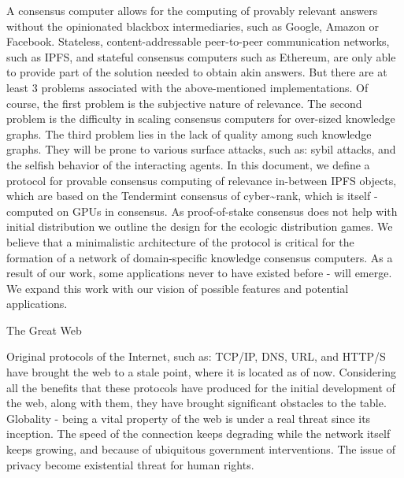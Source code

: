 \documentclass[8pt,oneside]{amsart}
\title{\fontsize{16}{17}\selectfont\textnormal{\MakeLowercase{\play{cyber: \uppercase{C}omputing the knowledge of the \uppercase{G}reat \uppercase{W}eb}}}}
\author{\fontsize{8}{9}\selectfont{
    \MakeLowercase{
    @xhipster \& @litvintech work in progress as of \today
    }
  }
}
\makeatletter
\renewcommand\subsection{\@startsection{subsection}
                                    {2}{\z@}
                                    {-3.25ex\@plus -1ex \@minus -.2ex}
                                    {0ex \@plus .2ex}
                                    {\play\Large}
                        }
\newcommand{\titleSection}[1]{\subsection{#1}}
\newenvironment{Figure}
  {\par\medskip\noindent\minipage{\linewidth}}
  {\endminipage\par\medskip}
\providecommand\abstractname{Abstract}
\renewenvironment{abstract}{%
  \centering\normalfont
  \list{}{\leftmargin2.1cm \rightmargin\leftmargin}
  {\par\noindent{\normalfont\abstractname.}}
  \item\relax
}{

  \endlist \par\bigskip
}
\makeatother
\begin{document}
\maketitle
\selectfont
\raggedbottom
\justifying

\vspace{-3em}{
\begin{Figure}
\medskip
\centering
\texttt{[image: graph.png]}
\medskip
\end{Figure}
}

\begin{abstract}
A consensus computer allows for the computing of provably relevant answers without the opinionated blackbox intermediaries, such as Google, Amazon or Facebook. Stateless, content-addressable peer-to-peer communication networks, such as IPFS, and stateful consensus computers such as Ethereum, are only able to provide part of the solution needed to obtain akin answers. But there are at least 3 problems associated with the above-mentioned implementations. Of course, the first problem is the subjective nature of relevance. The second problem is the difficulty in scaling consensus computers for over-sized knowledge graphs. The third problem lies in the lack of quality among such knowledge graphs. They will be prone to various surface attacks, such as: sybil attacks, and the selfish behavior of the interacting agents. In this document, we define a protocol for provable consensus computing of relevance in-between IPFS objects, which are based on the Tendermint consensus of cyber\~{}rank, which is itself - computed on GPUs in consensus. As proof-of-stake consensus does not help with initial distribution we outline the design for the ecologic distribution games. We believe that a minimalistic architecture of the protocol is critical for the formation of a network of domain-specific knowledge consensus computers. As a result of our work, some applications never to have existed before - will emerge. We expand this work with our vision of possible features and potential applications.
\end{abstract}

\titleSection{The Great Web}\label{great-web}

Original protocols of the Internet, such as: TCP/IP, DNS, URL, and HTTP/S have brought the web to a stale point, where it is located as of now. Considering all the benefits that these protocols have produced for the initial development of the web, along with them, they have brought significant obstacles to the table. Globality - being a vital property of the web is under a real threat since its inception. The speed of the connection keeps degrading while the network itself keeps growing, and because of ubiquitous government interventions. The issue of privacy become existential threat for human rights.
\end{document}
